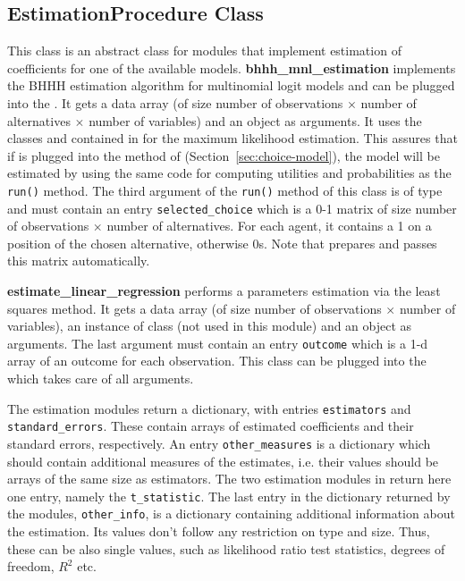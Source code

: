 {\subsection{EstimationProcedure Class}
\label{sec:estimation-procedure}
%
This class is an abstract class for modules that implement estimation of
coefficients \coefficientsindex for one of the available models. {\bf bhhh_mnl_estimation}
implements the BHHH estimation algorithm for multinomial logit models and can
be plugged into the . It gets a data array (of size number
of observations $\times$ number of alternatives $\times$ number of variables) \variablesindex
and an object  as arguments. It uses the classes
 and  contained in 
for the maximum likelihood estimation. This assures that if
 is plugged into the  method of
 (Section~\ref{sec:choice-model}), the model will be
estimated by using the same code for computing utilities and probabilities as
the \verb|run()| method.  The third argument of the \verb|run()| method of
this class is of type  and must contain an entry
\verb|selected_choice| which is a 0-1 matrix of size number of observations
$\times$ number of alternatives. For each agent, it contains a 1 on a position
of the chosen alternative, otherwise 0s. Note that 
prepares and passes this matrix automatically.

{\bf estimate_linear_regression} performs a parameters estimation via the
least squares method. It gets a data array (of size number of observations
$\times$ number of variables), \variablesindex an instance of class  (not
used in this module) and an object  as arguments. The last
argument must contain an entry \verb|outcome| which is a 1-d array of an outcome
for each observation. This class can be plugged into the
 which takes care of all arguments.

The estimation modules return a dictionary, with entries \verb|estimators| and
\verb|standard_errors|. These contain arrays of estimated coefficients \coefficientsindex and their
standard errors, respectively. An entry \verb|other_measures| is a dictionary
which should contain additional measures of the estimates, i.e. their values
should be arrays of the same size as estimators. The two estimation modules
in  return here one entry, namely the \verb|t_statistic|. The last entry in
the dictionary returned by the modules, \verb|other_info|, is a dictionary
containing additional information about the estimation. Its values don't
follow any restriction on type and size. Thus, these can be also single values,
such as likelihood ratio test statistics, degrees of freedom, $R^2$ etc.

}
